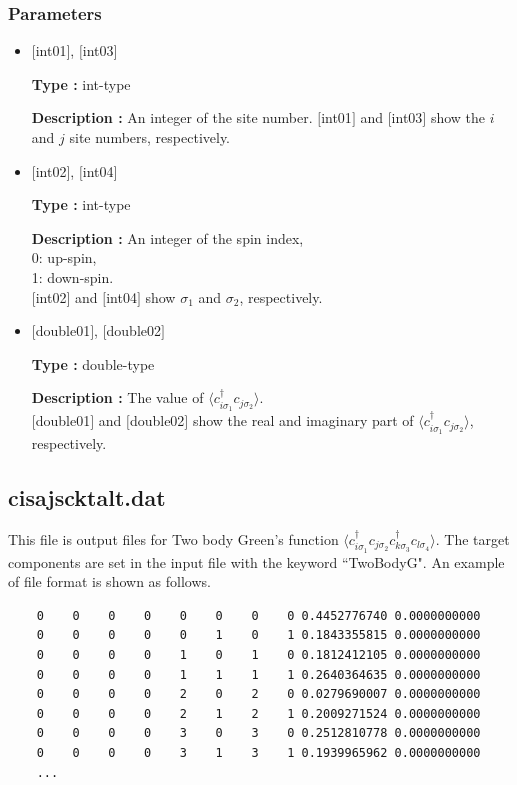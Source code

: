 \subsubsection{Parameters}
 \begin{itemize}

  \item  $[$int01$]$, $[$int03$]$

 {\bf Type :} int-type

{\bf Description :} An integer of the site number. $[$int01$]$ and $[$int03$]$ show the $i$ and $j$ site numbers, respectively.
 
  \item  $[$int02$]$, $[$int04$]$

 {\bf Type :} int-type 

{\bf Description :} An integer of the spin index,\\
   0: up-spin,\\
   1: down-spin.\\ 
$[$int02$]$ and $[$int04$]$ show $\sigma_1$ and $\sigma_2$, respectively. \\

  \item  $[$double01$]$, $[$double02$]$

 {\bf Type :} double-type 

{\bf Description :} The value of $\langle c_{i\sigma_1}^{\dagger}c_{j\sigma_2}\rangle$.\\
$[$double01$]$ and $[$double02$]$ show the real and imaginary part of $\langle c_{i\sigma_1}^{\dagger}c_{j\sigma_2}\rangle$, respectively.
\end{itemize}

\newpage
\subsection{cisajscktalt.dat}
\label{Subsec:cisajscktalt}
This file is output files for Two body Green's function $\langle c_{i\sigma_1}^{\dagger}c_{j\sigma_2}c_{k\sigma_3}^{\dagger}c_{l\sigma_4}\rangle$. 
The target components are set in the input file with the keyword ``TwoBodyG".
An example of file format is shown as follows.

\begin{minipage}{15cm}
\begin{screen}
\begin{verbatim}
    0    0    0    0    0    0    0    0 0.4452776740 0.0000000000
    0    0    0    0    0    1    0    1 0.1843355815 0.0000000000
    0    0    0    0    1    0    1    0 0.1812412105 0.0000000000
    0    0    0    0    1    1    1    1 0.2640364635 0.0000000000
    0    0    0    0    2    0    2    0 0.0279690007 0.0000000000
    0    0    0    0    2    1    2    1 0.2009271524 0.0000000000
    0    0    0    0    3    0    3    0 0.2512810778 0.0000000000
    0    0    0    0    3    1    3    1 0.1939965962 0.0000000000
    ...
\end{verbatim}
\end{screen}
\end{minipage}

